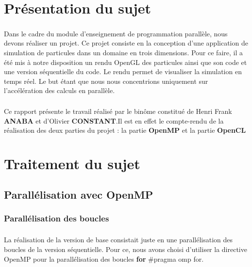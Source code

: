 \documentclass[a4paper,11pt]{report}
\begin{document}

\newpage

\begingroup
\tableofcontents*
\endgroup



\chapter{Présentation du sujet}

\paragraph{}
Dans le cadre du module d'enseignement de programmation parallèle, nous devons réaliser un projet. Ce projet consiste en la conception d'une application de simulation de particules dans un domaine en trois dimensions. Pour ce faire, il a été mis à notre disposition un rendu OpenGL des particules ainsi que son code et une version séquentielle du code. Le rendu permet de visualiser la simulation en temps réel. Le but étant que nous nous concentrions uniquement sur l'accélération des calculs en parallèle.
\paragraph{}
Ce rapport présente le travail réalisé par le binôme constitué de Henri Frank \textbf{ANABA} et d'Olivier \textbf{CONSTANT}.Il est en effet le compte-rendu de la réalisation  des deux parties  du projet : la partie \textbf{OpenMP} et la partie  \textbf{OpenCL}


\chapter{Traitement du sujet}
\section{Parallélisation avec \textbf{OpenMP}}


\subsection{Parallélisation des boucles}

\paragraph{}
La réalisation de la version de base consistait juste en une parallélisation des boucles de la version séquentielle. Pour ce, nous avons choisi d'utiliser la directive OpenMP pour la parallélisation des boucles \textbf{for} \#pragma omp for. 
\end{document}
